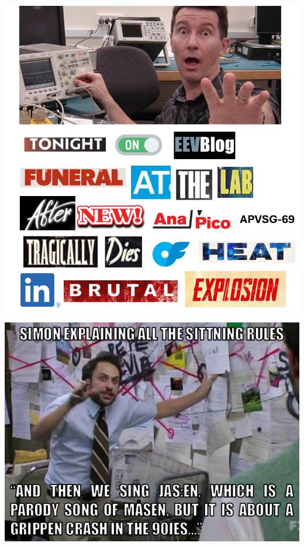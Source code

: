 \documentclass{article}
\title{\vspace{40em}\textbf{\color{white}\Huge{}}}
\date{\vspace{-3em}\color{white}}
\author{}
\begin{document}
\customtitle
\BgThispage
\clearpage

\newpage

\sffamily


\vfill
\includegraphics[width=0.9\linewidth]{images/memes/apvsg69.png}

\vfill
\newpage

\normalfont
\sitsit
\vfill

\sffamily
\vfill

\includegraphics[width=0.9\linewidth]{images/memes/jasen.png}
\vfill
\end{document}
